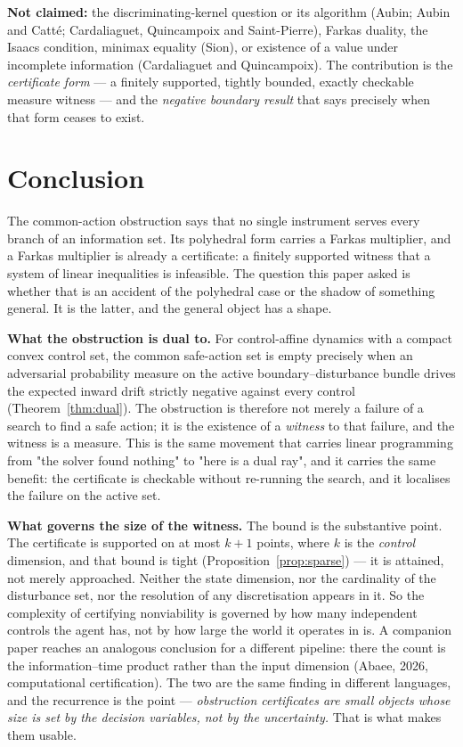 \documentclass[10pt,twocolumn]{article}
\theoremstyle{definition}
\begin{document}
\noindent \textbf{Not claimed:} the discriminating-kernel question or its algorithm (Aubin;
Aubin and Catt\'e; Cardaliaguet, Quincampoix and Saint-Pierre), Farkas duality, the Isaacs
condition, minimax equality (Sion), or existence of a value under incomplete information
(Cardaliaguet and Quincampoix). The contribution is the \emph{certificate form} --- a
finitely supported, tightly bounded, exactly checkable measure witness --- and the
\emph{negative boundary result} that says precisely when that form ceases to exist.

\section{Conclusion}
\label{conclusion}

The common-action obstruction says that no single instrument serves every branch of an
information set. Its polyhedral form carries a Farkas multiplier, and a Farkas multiplier is
already a certificate: a finitely supported witness that a system of linear inequalities is
infeasible. The question this paper asked is whether that is an accident of the polyhedral
case or the shadow of something general. It is the latter, and the general object has a
shape.

\textbf{What the obstruction is dual to.} For control-affine dynamics with a compact convex
control set, the common safe-action set is empty precisely when an adversarial probability
measure on the active boundary--disturbance bundle drives the expected inward drift strictly
negative against every control (Theorem~\ref{thm:dual}). The obstruction is therefore not
merely a failure of a search to find a safe action; it is the existence of a \emph{witness} to
that failure, and the witness is a measure. This is the same movement that carries linear
programming from "the solver found nothing" to "here is a dual ray", and it carries the same
benefit: the certificate is checkable without re-running the search, and it localises the
failure on the active set.

\textbf{What governs the size of the witness.} The bound is the substantive point. The
certificate is supported on at most \(k + 1\) points, where \(k\) is the \emph{control}
dimension, and that bound is tight (Proposition~\ref{prop:sparse}) --- it is attained, not
merely approached. Neither the state dimension, nor the cardinality of the disturbance set,
nor the resolution of any discretisation appears in it. So the complexity of certifying
nonviability is governed by how many independent controls the agent has, not by how large the
world it operates in is. A companion paper reaches an analogous conclusion for a different
pipeline: there the count is the information--time product rather than the input dimension
(Abaee, 2026, computational certification). The two are the same finding in different
languages, and the recurrence is the point --- \emph{obstruction certificates are small
objects whose size is set by the decision variables, not by the uncertainty.} That is what
makes them usable.
\end{document}
